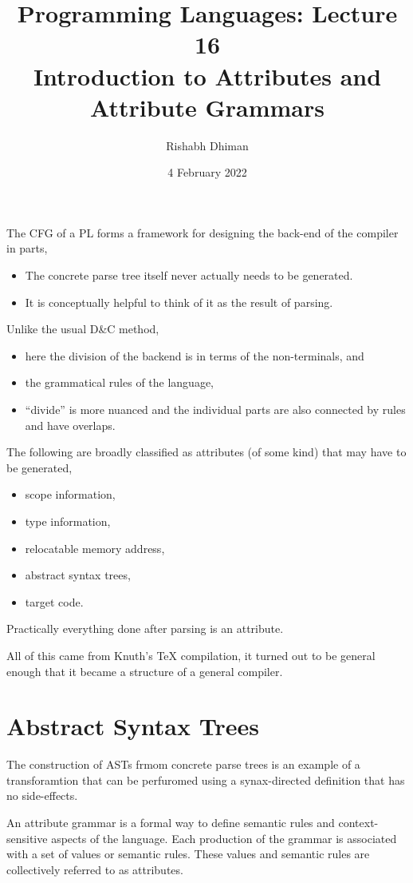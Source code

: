 \documentclass[a4paper]{scrartcl}
\title{
	Programming Languages: Lecture 16\\
	Introduction to Attributes and Attribute Grammars
}
\author{Rishabh Dhiman}
\date{4 February 2022}
\theoremstyle{definition}
\begin{document}
\maketitle

The CFG of a PL forms a framework for designing the back-end of the compiler in parts,
\begin{itemize}
	\item The concrete parse tree itself never actually needs to be generated.
	\item It is conceptually helpful to think of it as the result of parsing.
\end{itemize}

Unlike the usual D\&C method,
\begin{itemize}
	\item here the division of the backend is in terms of the non-terminals, and
	\item the grammatical rules of the language,
	\item ``divide'' is more nuanced and the individual parts are also connected by rules and have overlaps.
\end{itemize}

The following are broadly classified as attributes (of some kind) that may have to be generated,
\begin{itemize}
	\item scope information,
	\item type information,
	\item relocatable memory address,
	\item abstract syntax trees,
	\item target code.
\end{itemize}
Practically everything done after parsing is an attribute.

All of this came from Knuth's TeX compilation, it turned out to be general enough that it became a structure of a general compiler.

\section{Abstract Syntax Trees}
The construction of ASTs frmom concrete parse trees is an example of a transforamtion that can be perfuromed using a synax-directed definition that has no side-effects.

An attribute grammar is a formal way to define semantic rules and context-sensitive aspects of the language. Each production of the grammar is associated with a set of values or semantic rules. These values and semantic rules are collectively referred to as attributes.
\end{document}
